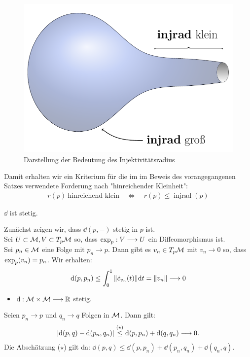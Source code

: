 \begin{figure}[H]
	\centering
	\includegraphics[scale=0.6]{figures/tikz/injrad}
	\caption{Darstellung der Bedeutung des Injektivitätsradius}
\end{figure}
Damit erhalten wir ein Kriterium für die im im Beweis des vorangegangenen Satzes verwendete Forderung nach "hinreichender Kleinheit":
\begin{align}
r(p) \ \text{hinreichend klein} \quad \Leftrightarrow \quad r(p) \leq \operatorname{injrad}(p)
\end{align}

\begin{lem}
$\dd$ ist stetig.
\end{lem}
\begin{bew}
Zunächst zeigen wir, dass $\dd(p,-)$ stetig in $p$ ist. \\
Sei $U \subset \mathcal{M}, V \subset T_p\mathcal{M}$ so, dass $\operatorname{exp}_p: V \longrightarrow U$ ein Diffeomorphismus ist. \\
Sei $p_n \in \mathcal{M}$ eine Folge mit $p_n \rightarrow p$. Dann gibt es $v_n \in T_p\mathcal{M}$ mit $v_n \rightarrow 0$ so, dass $\operatorname{exp}_p(v_n) = p_n$. Wir erhalten:
\begin{align*}
\dd(p, p_n) \leq \int_0^1 \norm{\dot{c}_{v_n}(t)} \dd t = \norm{v_n} \longrightarrow 0
\end{align*}
\end{bew}

\begin{itemize}
\item $\dd: \mathcal{M} \times \mathcal{M} \longrightarrow \mathbb{R} $ stetig.
\end{itemize}
Seien $p_n \rightarrow p$ und $q_n \rightarrow q$ Folgen in $\mathcal{M}$. Dann gilt:
\begin{align*}
\abs{\dd(p, q)- \dd(p_n, q_n)} \overset{(\star)}{\leq} \dd(p, p_n) + \dd(q, q_n) \longrightarrow 0.
\end{align*}
Die Abschätzung ($\star$) gilt da: $\dd(p, q) \leq \dd(p, p_n) + \dd(p_n,q_n) + \dd(q_n, q)$. 
